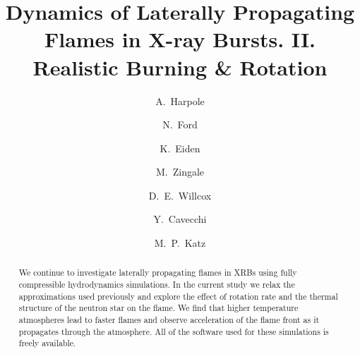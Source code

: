 \documentclass[preprint,times,tighten]{aastex63}
\begin{document}
\title{Dynamics of Laterally Propagating Flames in X-ray Bursts. II. Realistic Burning \& Rotation}


\author[0000-0002-1530-781X]{A.\ Harpole}

\author[0000-0001-8921-3624]{N.\ Ford}

\author[0000-0001-6191-4285]{K.\ Eiden}

\author[0000-0001-8401-030X]{M.\ Zingale}

\author[0000-0003-2300-5165]{D.\ E.\ Willcox}

\author[0000-0002-6447-3603]{Y.\ Cavecchi}

\author[0000-0003-0439-4556]{M.\ P.\ Katz}




\begin{abstract}
We continue to investigate laterally propagating flames in XRBs using
fully compressible hydrodynamics simulations.  In the current study we
relax the approximations used previously and explore the effect of
rotation rate and the thermal structure of the neutron star on the
flame.  We find that higher temperature atmospheres lead to faster
flames and observe acceleration of the flame front as it propagates
through the atmosphere.  All of the software used for these
simulations is freely available.


\end{abstract}
\end{document}
